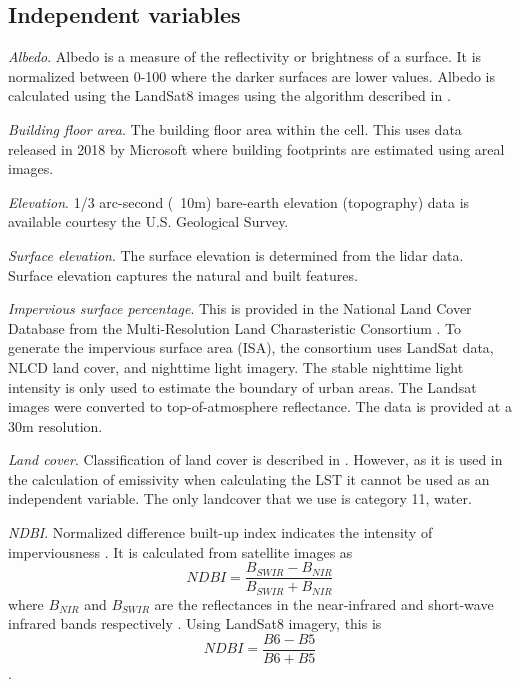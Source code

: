\documentclass[review]{elsarticle}
\begin{document}
\subsection{Independent variables}

\textit{Albedo}. Albedo is a measure of the reflectivity or brightness of a surface. It is normalized between 0-100 where the darker surfaces are lower values. Albedo is calculated using the LandSat8 images using the algorithm described in \cite{Smith2010-nw, Liang2001-jd}. 

\textit{Building floor area}. The building floor area within the cell. This uses data released in 2018 by Microsoft where building footprints are estimated using areal images. 


\textit{Elevation}. 1/3 arc-second (~10m) bare-earth elevation (topography) data is available courtesy the U.S. Geological Survey. 

\textit{Surface elevation}. The surface elevation is determined from the lidar data. Surface elevation captures the natural and built features. 

\textit{Impervious surface percentage}. This is provided in the National Land Cover Database from the Multi-Resolution Land Charasteristic Consortium \cite{Xian2011-aa}. 
To generate the impervious surface area (ISA), the consortium uses LandSat data, NLCD land cover, and nighttime light imagery. 
The stable nighttime light intensity is only used to estimate the boundary of urban areas. 
The Landsat images were converted to top-of-atmosphere reflectance. 
The data is provided at a 30m resolution.

\textit{Land cover}. 
Classification of land cover is described in \cite{Homer2015-ce}. 
However, as it is used in the calculation of emissivity when calculating the LST it cannot be used as an independent variable. 
The only landcover that we use is category 11, water. 

\textit{NDBI}. 
Normalized difference built-up index indicates the intensity of imperviousness \cite{Bhatti2014-ae}. 
It is calculated from satellite images as $$NDBI=\frac{B_{SWIR}-B_{NIR}}{B_{SWIR}+B_{NIR}}$$ where $B_{NIR}$ and $B_{SWIR}$ are the reflectances in the near-infrared and short-wave infrared bands respectively \cite{Alhawiti2016-wv}. 
Using LandSat8 imagery, this is $$NDBI=\frac{B6-B5}{B6+B5}$$ \cite{barsi2014}.
\end{document}
